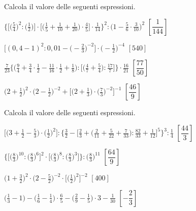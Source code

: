 \begin{esercizio}[\Ast]
\label{ese:3.150}
 Calcola il valore delle seguenti espressioni.
\begin{enumeratea}
\spazielenx
\item $\displaystyle{\bigg\{\bigg[\bigg(\frac{5}{4}\bigg)^{2}:
\bigg(\frac{1}{2}\bigg)\bigg]\cdot%
\bigg[\bigg(\frac{1}{5}+\frac{1}{10}+\frac{1}{20}\bigg)\cdot\frac{4}{5}\bigg]
\cdot%
\frac{1}{14}\bigg\}^{2}:\bigg(1-\frac{5}{6}\cdot\frac{3}{10}\bigg)^{2}}$
  \hfill \(\left[\dfrac{1}{144} \right]\)
\item $\displaystyle{\bigg[(0,4-1)^{2}:0,01-\bigg(-{\frac{2}{3}}\bigg)^{-2}
\bigg]\cdot
\bigg(-{\frac{1}{2}}\bigg)^{-4}}$
  \hfill \(\left[540 \right]\)
\item $\displaystyle{\frac{7}{23}\bigg\{\bigg(\frac{9}{4}+\frac{3}{4}\cdot
{\frac{1}{2}}-\frac{11}{16}\cdot\frac{1}{2}+\frac{1}{8}\bigg):\bigg[
\bigg(\frac{4}{7}+\frac{5}{4}\bigg):\frac{17}{7}\bigg]\bigg\}\cdot
{\frac{16}{21}}}$
  \hfill \(\left[\dfrac{77}{50} \right]\)
\item $\displaystyle{\bigg(2+\frac{1}{2}\bigg)^{2} \cdot \bigg(2-\frac{1}{2}
\bigg)^{-2}+\bigg[\bigg(2+\frac{1}{3}\bigg)\cdot
\bigg(\frac{7}{3}\bigg)^{-2}\bigg]^{-1}}$
  \hfill \(\left[\dfrac{46}{9} \right]\)
\end{enumeratea}
\end{esercizio}

\begin{esercizio}[\Ast]
\label{ese:3.151}
 Calcola il valore delle seguenti espressioni.
\begin{enumeratea}
\spazielenx
\item $\displaystyle{\bigg[\bigg(3+\frac{1}{2}-\frac{5}{3}\bigg)\cdot
\bigg(\frac{1}{2}\bigg)^{2}\bigg]:\bigg\{\frac{3}{2}-\bigg[\frac{2}{3}+
\bigg(\frac{2}{11}+
\frac{5}{22}+\frac{7}{33}\bigg):\frac{82}{33}+\frac{1}{12}\bigg]^{5}
\bigg\}^{3}:\frac{1}{4}}$
  \hfill \(\left[\dfrac{44}{3} \right]\)
\item $\displaystyle{\bigg\{\bigg[\bigg(\frac{8}{3}\bigg)^{10}:
\bigg(\frac{8}{3}\bigg)^{6}\bigg]^{2}\cdot
\bigg[\bigg(\frac{8}{3}\bigg)^{8}:\bigg(\frac{8}{3}\bigg)^{3}\bigg]\bigg\}:
\bigg(\frac{8}{3}\bigg)^{11}}$
  \hfill \(\left[\dfrac{64}{9} \right]\)
\item $\displaystyle{\bigg(1+\frac{3}{2}\bigg)^{2}\cdot
\bigg(2-\frac{5}{2}\bigg)^{-2}\cdot
\bigg[\bigg(\frac{1}{2}\bigg)^{2}\bigg]^{-2}}$
  \hfill \(\left[400 \right]\)
\item $\displaystyle{\bigg(\frac{1}{3}-1\bigg)-\bigg(\frac{1}{6}-
\frac{1}{4}\bigg)\cdot
{\frac{6}{5}}-\bigg(\frac{2}{9}-\frac{1}{5}\bigg)\cdot 3-\frac{1}{30}}$
  \hfill \(\left[-\dfrac{2}{3} \right]\)
\end{enumeratea}
\end{esercizio}

